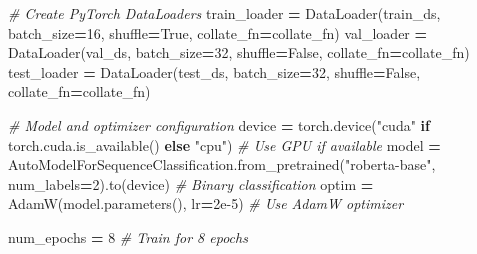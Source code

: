 \documentclass[
]{article}
\newenvironment{Shaded}{\begin{snugshade}}{\end{snugshade}}
\newcommand{\CommentTok}[1]{\textcolor[rgb]{0.56,0.35,0.01}{\textit{#1}}}
\newcommand{\ControlFlowTok}[1]{\textcolor[rgb]{0.13,0.29,0.53}{\textbf{#1}}}
\newcommand{\DecValTok}[1]{\textcolor[rgb]{0.00,0.00,0.81}{#1}}
\newcommand{\FloatTok}[1]{\textcolor[rgb]{0.00,0.00,0.81}{#1}}
\newcommand{\NormalTok}[1]{#1}
\newcommand{\OperatorTok}[1]{\textcolor[rgb]{0.81,0.36,0.00}{\textbf{#1}}}
\newcommand{\StringTok}[1]{\textcolor[rgb]{0.31,0.60,0.02}{#1}}
\newcommand{\VariableTok}[1]{\textcolor[rgb]{0.00,0.00,0.00}{#1}}
\begin{document}
\begin{Shaded}
\begin{Highlighting}[]
\CommentTok{\# Create PyTorch DataLoaders}
\NormalTok{train\_loader }\OperatorTok{=}\NormalTok{ DataLoader(train\_ds, batch\_size}\OperatorTok{=}\DecValTok{16}\NormalTok{, shuffle}\OperatorTok{=}\VariableTok{True}\NormalTok{, collate\_fn}\OperatorTok{=}\NormalTok{collate\_fn)}
\NormalTok{val\_loader   }\OperatorTok{=}\NormalTok{ DataLoader(val\_ds,   batch\_size}\OperatorTok{=}\DecValTok{32}\NormalTok{, shuffle}\OperatorTok{=}\VariableTok{False}\NormalTok{, collate\_fn}\OperatorTok{=}\NormalTok{collate\_fn)}
\NormalTok{test\_loader  }\OperatorTok{=}\NormalTok{ DataLoader(test\_ds,  batch\_size}\OperatorTok{=}\DecValTok{32}\NormalTok{, shuffle}\OperatorTok{=}\VariableTok{False}\NormalTok{, collate\_fn}\OperatorTok{=}\NormalTok{collate\_fn)}

\CommentTok{\# Model and optimizer configuration}
\NormalTok{device }\OperatorTok{=}\NormalTok{ torch.device(}\StringTok{"cuda"} \ControlFlowTok{if}\NormalTok{ torch.cuda.is\_available() }\ControlFlowTok{else} \StringTok{"cpu"}\NormalTok{)  }\CommentTok{\# Use GPU if available}
\NormalTok{model  }\OperatorTok{=}\NormalTok{ AutoModelForSequenceClassification.from\_pretrained(}\StringTok{"roberta{-}base"}\NormalTok{, num\_labels}\OperatorTok{=}\DecValTok{2}\NormalTok{).to(device)  }\CommentTok{\# Binary classification}
\NormalTok{optim  }\OperatorTok{=}\NormalTok{ AdamW(model.parameters(), lr}\OperatorTok{=}\FloatTok{2e{-}5}\NormalTok{)  }\CommentTok{\# Use AdamW optimizer}

\NormalTok{num\_epochs }\OperatorTok{=} \DecValTok{8}  \CommentTok{\# Train for 8 epochs}


\end{Highlighting}
\end{Shaded}
\end{document}
